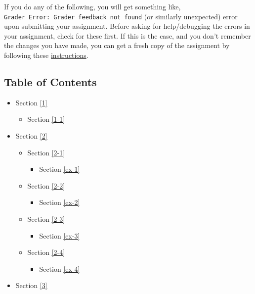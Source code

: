 \documentclass[11pt]{article}
\providecommand{\tightlist}{%
      \setlength{\itemsep}{0pt}\setlength{\parskip}{0pt}}
\begin{document}
If you do any of the following, you will get something like,
\texttt{Grader\ Error:\ Grader\ feedback\ not\ found} (or similarly
unexpected) error upon submitting your assignment. Before asking for
help/debugging the errors in your assignment, check for these first. If
this is the case, and you don't remember the changes you have made, you
can get a fresh copy of the assignment by following these
\href{https://www.coursera.org/learn/deep-neural-network/supplement/QWEnZ/h-ow-to-refresh-your-workspace}{instructions}.

    \hypertarget{table-of-contents}{%
\subsection{Table of Contents}\label{table-of-contents}}

\begin{itemize}
\tightlist
\item
  Section \ref{1}

  \begin{itemize}
  \tightlist
  \item
    Section \ref{1-1}
  \end{itemize}
\item
  Section \ref{2}

  \begin{itemize}
  \tightlist
  \item
    Section \ref{2-1}

    \begin{itemize}
    \tightlist
    \item
      Section \ref{ex-1}
    \end{itemize}
  \item
    Section \ref{2-2}

    \begin{itemize}
    \tightlist
    \item
      Section \ref{ex-2}
    \end{itemize}
  \item
    Section \ref{2-3}

    \begin{itemize}
    \tightlist
    \item
      Section \ref{ex-3}
    \end{itemize}
  \item
    Section \ref{2-4}

    \begin{itemize}
    \tightlist
    \item
      Section \ref{ex-4}
    \end{itemize}
  \end{itemize}
\item
  Section \ref{3}


\end{itemize}
\end{document}
